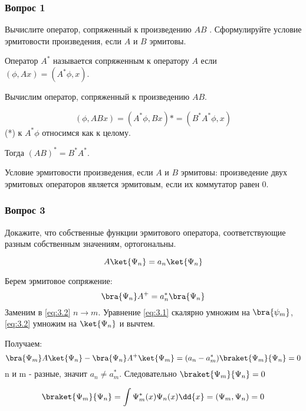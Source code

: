 \subsubsection{Вопрос 1}

Вычислите оператор, сопряженный к произведению $AB$ . Сформулируйте условие эрмитовости произведения, если $A$ и $B$ эрмитовы.

Оператор $A^*$ называется сопряженным к оператору $A$ если $(\phi, Ax)=(A^*\phi,x).$

Вычислим оператор, сопряженный к произведению $AB$.

$$(\phi, ABx)= (A^*\phi,Bx)*=(B^*A^*\phi,x) $$
(*) к $A^*\phi$  относимся как к целому.

Тогда $(AB)^*=B^*A^*.$

Условие эрмитовости произведения, если $A$ и  $B$ эрмитовы:
произведение двух эрмитовых операторов является эрмитовым, если их коммутатор равен 0.

\subsubsection{Вопрос 3}
Докажите, что собственные функции эрмитового оператора, соответствующие разным собственным значениям, ортогональны.


\begin{equation}
\label{eq:3.1}
A\ket{\Psi_n}=a_n\ket{\Psi_n} 	
\end{equation}

Берем эрмитовое сопряжение:
\begin{equation}
	\label{eq:3.2}
\bra{\Psi_n}A^+=a_n^*\bra{\Psi_n} 
\end{equation}
Заменим в \eqref{eq:3.2} $n\rightarrow m$. Уравнение \eqref{eq:3.1} скалярно умножим на $\bra{\psi_m}$, \eqref{eq:3.2} умножим на $\ket{\Psi_n}$  и вычтем.

Получаем:
\begin{equation}
	\bra{\Psi_m}A\ket{\Psi_n}-\bra{\Psi_n}A^+\ket{\Psi_m}=(a_n-a^*_m)
	\braket{\Psi_m}{\Psi_n}=0
\end{equation}
n и m - разные, значит $a_n\neq a_m^*$. Следовательно $\braket{\Psi_m}{\Psi_n}=0$

$$\big \braket{\Psi_m}{\Psi_n}=\int \Psi_m^*(x)\Psi_n(x)\dd{x}=(\Psi_m,\Psi_n)=0 $$